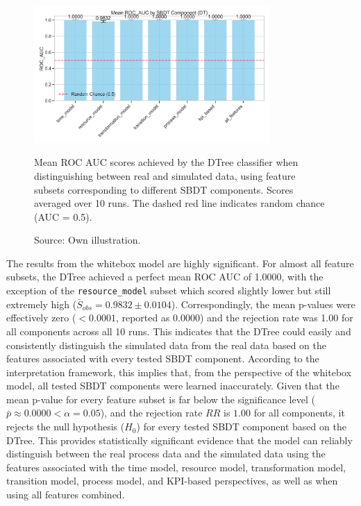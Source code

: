 \begin{figure}[htbp]
  \centering
  \includegraphics[width=0.8\textwidth]{figures/dt-roc-auc-by-component.png}
  \caption[Results Decision Tree]{Mean ROC AUC scores achieved by the DTree classifier when distinguishing between real and simulated data, using feature subsets corresponding to different SBDT components. Scores averaged over 10 runs. The dashed red line indicates random chance (AUC = 0.5).}
  \label{fig:dt-roc-auc}
  \caption*{Source: Own illustration.}
\end{figure}

The results from the whitebox model are highly significant. For almost all feature subsets, the DTree achieved a perfect mean ROC AUC of 1.0000, with the exception of the \texttt{resource\_model} subset which scored slightly lower but still extremely high ($\bar{S}_{obs}=0.9832 \pm 0.0104$). Correspondingly, the mean p-values were effectively zero ($< 0.0001$, reported as 0.0000) and the rejection rate was 1.00 for all components across all 10 runs. This indicates that the DTree could easily and consistently distinguish the simulated data from the real data based on the features associated with every tested SBDT component. According to the interpretation framework, this implies that, from the perspective of the whitebox model, all tested SBDT components were learned inaccurately.
Given that the mean p-value for every feature subset is far below the significance level ($\bar{p} \approx 0.0000 < \alpha = 0.05$), and the rejection rate $RR$ is $1.00$ for all components, it rejects the null hypothesis ($H_0$) for every tested SBDT component based on the DTree. This provides statistically significant evidence that the model can reliably distinguish between the real process data and the simulated data using the features associated with the time model, resource model, transformation model, transition model, process model, and KPI-based perspectives, as well as when using all features combined.

